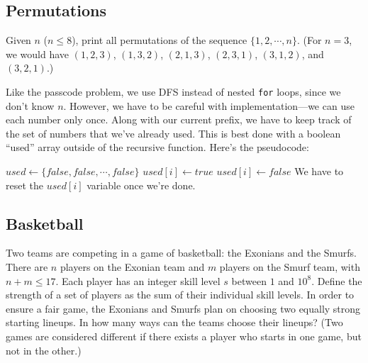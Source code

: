 \noindent \begin{minipage}{\textwidth}
  \begin{algorithmic}[1]
      \State {}
      \State \Return
    \EndIf
      \State {}
    \EndFor
    \EndFunction
  \end{algorithmic}
\end{minipage}

\subsection{Permutations}

\begin{typewriter}
  Given $n$ ($n \le 8$), print all permutations of the sequence $\{1, 2, \cdots, n\}$. (For $n=3$, we would have $(1, 2, 3)$, $(1, 3, 2)$, $(2, 1, 3)$, $(2, 3, 1)$, $(3, 1, 2)$, and $(3, 2, 1)$.)
\end{typewriter}

Like the passcode problem, we use DFS instead of nested \texttt{for} loops, since we don't know $n$. However, we have to be careful with implementation---we can use each number only once. Along with our current prefix, we have to keep track of the set of numbers that we've already used. This is best done with a boolean ``used'' array outside of the recursive function. Here's the pseudocode:

\noindent \begin{minipage}{\textwidth}
  \begin{algorithmic}[1]
    \State $used \gets \{false, false, \cdots, false\}$
      \State {}
      \State \Return
    \EndIf
        \State $used[i] \gets true$
        \State {}
        \State $used[i] \gets false$
        \Comment We have to reset the $used[i]$ variable once we're done.
      \EndIf
    \EndFor
    \EndFunction
  \end{algorithmic}
\end{minipage}

\subsection{Basketball}

\begin{typewriter}
Two teams are competing in a game of basketball: the Exonians and the Smurfs. There are $n$ players on the Exonian team and $m$ players on the Smurf team, with $n + m \le 17$. Each player has an integer skill level $s$ between $1$ and $10^8$. Define the strength of a set of players as the sum of their individual skill levels. In order to ensure a fair game, the Exonians and Smurfs plan on choosing two equally strong starting lineups. In how many ways can the teams choose their lineups? (Two games are considered different if there exists a player who starts in one game, but not in the other.)
\end{typewriter}

